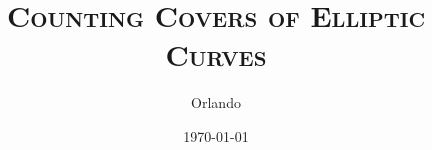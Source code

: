 \documentclass[a4paper,10pt]{article}
\title{\textsc{Counting Covers of Elliptic Curves}}
\author{Orlando}
\date{\today}
\begin{document}
\maketitle
\tableofcontents

 \clearpage
 \clearpage
 \clearpage
 \clearpage

{}

\end{document}
